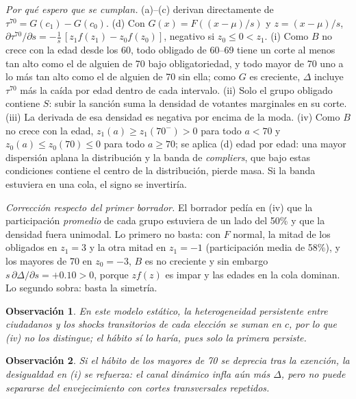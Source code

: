 \documentclass[11pt]{article}
\newtheorem*{remark}{Observación}
\begin{document}
\emph{Por qué espero que se cumplan.} (a)--(c) derivan directamente de $\tau^{70}=G(c_1)-G(c_0)$. (d) Con $G(x)=F((x-\mu)/s)$ y $z=(x-\mu)/s$, $\partial\tau^{70}/\partial s=-\tfrac1s\,[z_1f(z_1)-z_0f(z_0)]$, negativo si $z_0\le 0<z_1$. (i) Como $B$ no crece con la edad desde los 60, todo obligado de 60--69 tiene un corte al menos tan alto como el de alguien de 70 bajo obligatoriedad, y todo mayor de 70 uno a lo más tan alto como el de alguien de 70 sin ella; como $G$ es creciente, $\Delta$ incluye $\tau^{70}$ más la caída por edad dentro de cada intervalo. (ii) Solo el grupo obligado contiene $S$: subir la sanción suma la densidad de votantes marginales en su corte. (iii) La derivada de esa densidad es negativa por encima de la moda. (iv) Como $B$ no crece con la edad, $z_1(a)\ge z_1(70^-)>0$ para todo $a<70$ y $z_0(a)\le z_0(70)\le 0$ para todo $a\ge 70$; se aplica (d) edad por edad: una mayor dispersión aplana la distribución y la banda de \emph{compliers}, que bajo estas condiciones contiene el centro de la distribución, pierde masa. Si la banda estuviera en una cola, el signo se invertiría.

\emph{Corrección respecto del primer borrador.} El borrador pedía en (iv) que la participación \emph{promedio} de cada grupo estuviera de un lado del 50\% y que la densidad fuera unimodal. Lo primero no basta: con $F$ normal, la mitad de los obligados en $z_1=3$ y la otra mitad en $z_1=-1$ (participación media de 58\%), y los mayores de 70 en $z_0=-3$, $B$ es no creciente y sin embargo $s\,\partial\Delta/\partial s=+0.10>0$, porque $z f(z)$ es impar y las edades en la cola dominan. Lo segundo sobra: basta la simetría.

\begin{remark}
En este modelo estático, la heterogeneidad persistente entre ciudadanos y los shocks transitorios de cada elección se suman en $c$, por lo que (iv) no los distingue; el hábito sí lo haría, pues solo la primera persiste.
\end{remark}

\begin{remark}
Si el hábito de los mayores de 70 se deprecia tras la exención, la desigualdad en (i) se refuerza: el canal dinámico infla aún más $\Delta$, pero no puede separarse del envejecimiento con cortes transversales repetidos.
\end{remark}
\end{document}
